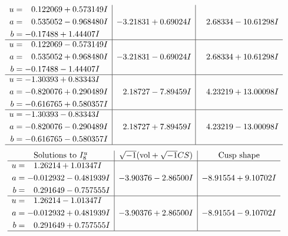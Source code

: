 \documentclass[1p]{elsarticle_modified}
\theoremstyle{definition}
\newcommand{\I}{\sqrt{-1}}
\begin{document}
$$\begin{array}{c|c|c}
\begin{aligned}
u &= \phantom{-}0.122069 + 0.573149 I \\
a &= \phantom{-}0.535052 - 0.968480 I \\
b &= -0.17488 + 1.44407 I\end{aligned}
 & -3.21831 + 0.69024 I & \phantom{-}2.68334 - 10.61298 I \\ \hline\begin{aligned}
u &= \phantom{-}0.122069 - 0.573149 I \\
a &= \phantom{-}0.535052 + 0.968480 I \\
b &= -0.17488 - 1.44407 I\end{aligned}
 & -3.21831 - 0.69024 I & \phantom{-}2.68334 + 10.61298 I \\ \hline\begin{aligned}
u &= -1.30393 + 0.83343 I \\
a &= -0.820076 + 0.290489 I \\
b &= -0.616765 + 0.580357 I\end{aligned}
 & \phantom{-}2.18727 - 7.89459 I & \phantom{-}4.23219 + 13.00098 I \\ \hline\begin{aligned}
u &= -1.30393 - 0.83343 I \\
a &= -0.820076 - 0.290489 I \\
b &= -0.616765 - 0.580357 I\end{aligned}
 & \phantom{-}2.18727 + 7.89459 I & \phantom{-}4.23219 - 13.00098 I\\
 \hline 
 \end{array}$$\newpage$$\begin{array}{c|c|c}  
\text{Solutions to }I^u_{8}& \I (\text{vol} + \sqrt{-1}CS) & \text{Cusp shape}\\
 \hline 
\begin{aligned}
u &= \phantom{-}1.26214 + 1.01347 I \\
a &= -0.012932 - 0.481939 I \\
b &= \phantom{-}0.291649 - 0.757555 I\end{aligned}
 & -3.90376 - 2.86500 I & -8.91554 + 9.10702 I \\ \hline\begin{aligned}
u &= \phantom{-}1.26214 - 1.01347 I \\
a &= -0.012932 + 0.481939 I \\
b &= \phantom{-}0.291649 + 0.757555 I\end{aligned}
 & -3.90376 + 2.86500 I & -8.91554 - 9.10702 I\\
 \hline 
 \end{array}$$\newpage\newpage\renewcommand{\arraystretch}{1}
\end{document}
